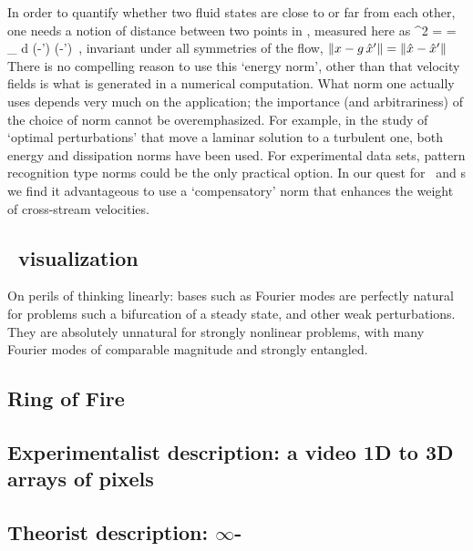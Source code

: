 In order to quantify
whether two fluid states are close to or far from each other, one
needs a notion of distance between two points in \statesp, measured
here as
\beq
  ^2  =  =
\int_\bCell \! d \bx \;
(-') \cdot (-')
\,,
invariant under all symmetries of the flow,
$\|{x-g\,{\hat{x}'}}\|=\|{\hat{x}-{\hat{x}'}}\|$
There is no compelling reason to use this {`energy norm'}, other than
that velocity fields is what is generated in a numerical
computation. What norm one actually uses depends very much on the
application; the importance (and arbitrariness) of the choice of
norm cannot be overemphasized. For example, in the study of `optimal perturbations' that
move a laminar solution to a turbulent one, both energy
\citep{TeHaHe10} and dissipation \citep{LoCaCoPeGo11} norms have been
used.
For experimental data sets, pattern recognition type norms could be the
only practical option.
In our quest for \reqva\ and \rpo s we
find it advantageous to use a `compensatory' norm 
that enhances the weight of cross-stream velocities.


\subsection{\Statesp\ visualization}

On perils of thinking linearly: bases such as Fourier modes are
perfectly natural for problems such a bifurcation of a steady state, and
other weak perturbations. They are absolutely unnatural for strongly
nonlinear problems, with many Fourier modes of comparable magnitude and
strongly entangled.

\subsection{\CLe}
\subsection{Ring of Fire}
\subsection{Experimentalist description: a video 1D to 3D arrays of pixels}
\subsection{Theorist description: $\infty$-\dmn\ \statesp}
